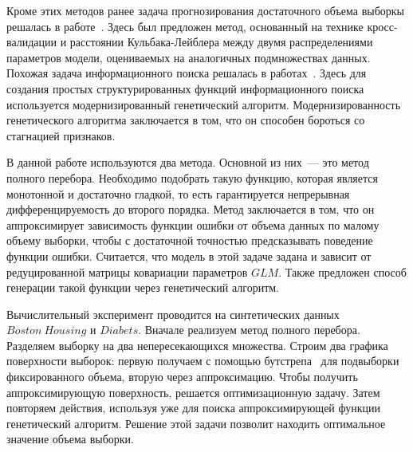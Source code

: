 \documentclass[12pt, twoside]{article}
\begin{document}
Кроме этих методов ранее задача прогнозирования достаточного объема выборкы решалась в работе~\cite{oai:dialnet.unirioja.es:ART0000605621}. Здесь был предложен метод, основанный на технике кросс-валидации и расстоянии Кульбака-Лейблера между двумя распределениями параметров модели, оцениваемых на аналогичных подмножествах данных. Похожая задача информационного поиска решалась в работах~\cite{journals/eswa/KulunchakovS17, oai:HAL:hal-01118844v1}. Здесь для создания простых структурированных функций информационного поиска используется модернизированный генетический алгоритм. Модернизированность генетического алгоритма заключается в том, что он способен бороться со стагнацией признаков.

В данной работе используются два метода. Основной из них~--- это метод полного перебора. Необходимо подобрать такую функцию, которая является монотонной и достаточно гладкой, то есть гарантируется непрерывная дифференцируемость до второго порядка. Метод заключается в том, что он аппроксимирует зависимость функции ошибки от объема данных по малому объему выборки, чтобы с достаточной точностью предсказывать поведение функции ошибки. Считается, что модель в этой задаче задана и зависит от редуцированной матрицы ковариации параметров $GLM$. Также предложен способ генерации такой функции через генетический алгоритм.



Вычислительный эксперимент проводится на синтетических данных $Boston\ Housing$ и $Diabets$. Вначале реализуем метод полного перебора. Разделяем выборку на два непересекающихся множества. Строим два графика поверхности выборок: первую получаем с помощью бутстрепа~\cite{Bishop06} для подвыборки фиксированного объема, вторую через аппроксимацию. Чтобы получить аппроксимирующую поверхность, решается оптимизационную задачу. Затем повторяем действия, используя уже для поиска аппроксимирующей функции генетический алгоритм. Решение этой задачи позволит находить оптимальное значение объема выборки. 





\end{document}
